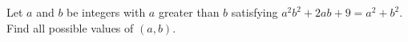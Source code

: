 Let $a$ and $b$ be integers with $a$ greater than $b$ satisfying $a^2b^2+2ab+9=a^2+b^2$. Find all possible values of $(a,b)$.
